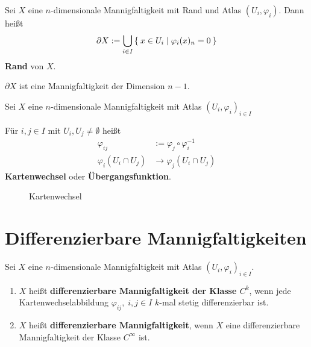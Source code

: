 \begin{definition}
    Sei $X$ eine $n$-dimensionale Mannigfaltigkeit mit Rand und
    Atlas $(U_i, \varphi_i)$. Dann heißt 
    \[\partial X := \bigcup_{i\in I} \Set{x \in U_i | \varphi_i (x)_n = 0}\]
    \textbf{Rand} von $X$.
\end{definition}

$\partial X$ ist eine Mannigfaltigkeit der Dimension $n-1$.

\begin{definition}
    Sei $X$ eine $n$-dimensionale Mannigfaltigkeit mit Atlas
    $(U_i, \varphi_i)_{i \in I}$

    Für $i, j \in I$ mit $U_i, U_j \neq \emptyset$ heißt
              \begin{align*}
                \varphi_{ij} &:= \varphi_j \circ \varphi_i^{-1}\\
                \varphi_i (U_i \cap U_j) &\rightarrow \varphi_j (U_i \cap U_j)
              \end{align*}
              \textbf{Kartenwechsel} oder \textbf{Übergangsfunktion}.
\end{definition}

\begin{figure}[htp]
    \centering
    
    \caption{Kartenwechsel}
    \label{fig:kartenwechsel}
\end{figure}

\section{Differenzierbare Mannigfaltigkeiten}
\begin{definition}
    Sei $X$ eine $n$-dimensionale Mannigfaltigkeit mit Atlas $(U_i, \varphi_i)_{i \in I}$.

    \begin{enumerate}[label=\alph*)]
        \item $X$ heißt \textbf{differenzierbare Mannigfaltigkeit der Klasse $C^k$},
              wenn jede Kartenwechselabbildung $\varphi_{ij},\;i,j \in I$
              $k$-mal stetig differenzierbar ist.
        \item $X$ heißt \textbf{differenzierbare Mannigfaltigkeit},
              wenn $X$ eine differenzierbare Mannigfaltigkeit der
              Klasse $C^\infty$ ist.
    \end{enumerate}
\end{definition}

